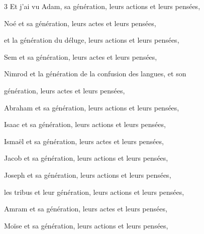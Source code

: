 \par 3 Et j'ai vu Adam, sa génération, leurs actions et leurs pensées,
\par Noé et sa génération, leurs actes et leurs pensées,
\par et la génération du déluge, leurs actions et leurs pensées,
\par Sem et sa génération, leurs actes et leurs pensées,
\par Nimrod et la génération de la confusion des langues, et son
\par génération, leurs actes et leurs pensées,
\par Abraham et sa génération, leurs actions et leurs pensées,
\par Isaac et sa génération, leurs actions et leurs pensées,
\par Ismaël et sa génération, leurs actes et leurs pensées,
\par Jacob et sa génération, leurs actions et leurs pensées,
\par Joseph et sa génération, leurs actions et leurs pensées,
\par les tribus et leur génération, leurs actions et leurs pensées,
\par Amram et sa génération, leurs actes et leurs pensées,
\par Moïse et sa génération, leurs actions et leurs pensées,

